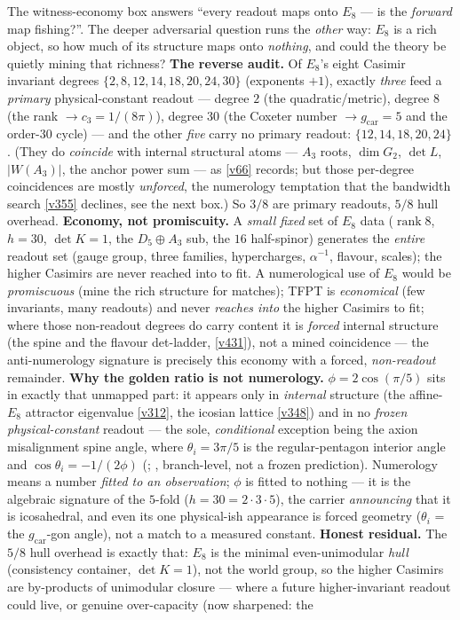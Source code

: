 \documentclass[11pt,a4paper]{article}
\newcommand{\cthree}{c_3}
\newcommand{\gcar}{g_{\mathrm{car}}}
\begin{document}
\begin{winbox}
The witness-economy box answers ``every readout maps onto $E_8$ --- is the \emph{forward} map fishing?''. The deeper adversarial question runs the \emph{other} way: $E_8$ is a rich object, so how much of its structure maps onto \emph{nothing}, and could the theory be quietly mining that richness? \textbf{The reverse audit.} Of $E_8$'s eight Casimir invariant degrees $\{2,8,12,14,18,20,24,30\}$ (exponents $+1$), exactly \emph{three} feed a \emph{primary} physical-constant readout --- degree $2$ (the quadratic/metric), degree $8$ (the rank $\to\cthree=1/(8\pi)$), degree $30$ (the Coxeter number $\to\gcar=5$ and the order-$30$ cycle) --- and the other \emph{five} carry no primary readout: $\{12,14,18,20,24\}$. (They do \emph{coincide} with internal structural atoms --- $A_3$ roots, $\dim G_2$, $\det L$, $|W(A_3)|$, the anchor power sum --- as \vref{v66} records; but those per-degree coincidences are mostly \emph{unforced}, the numerology temptation that the bandwidth search \vref{v355} declines, see the next box.) So $3/8$ are primary readouts, $5/8$ hull overhead. \textbf{Economy, not promiscuity.} A \emph{small fixed} set of $E_8$ data ($\operatorname{rank}8$, $h{=}30$, $\det K{=}1$, the $D_5{\oplus}A_3$ sub, the $16$ half-spinor) generates the \emph{entire} readout set (gauge group, three families, hypercharges, $\alpha^{-1}$, flavour, scales); the higher Casimirs are never reached into to fit. A numerological use of $E_8$ would be \emph{promiscuous} (mine the rich structure for matches); TFPT is \emph{economical} (few invariants, many readouts) and never \emph{reaches into} the higher Casimirs to fit; where those non-readout degrees do carry content it is \emph{forced} internal structure (the spine and the flavour det-ladder, \vref{v431}), not a mined coincidence --- the anti-numerology signature is precisely this economy with a forced, \emph{non-readout} remainder. \textbf{Why the golden ratio is not numerology.} $\phi=2\cos(\pi/5)$ sits in exactly that unmapped part: it appears only in \emph{internal} structure (the affine-$E_8$ attractor eigenvalue \vref{v312}, the icosian lattice \vref{v348}) and in no \emph{frozen physical-constant} readout --- the sole, \emph{conditional} exception being the axion misalignment spine angle, where $\theta_i=3\pi/5$ is the regular-pentagon interior angle and $\cos\theta_i=-1/(2\phi)$ (; \mC, branch-level, not a frozen prediction). Numerology means a number \emph{fitted to an observation}; $\phi$ is fitted to nothing --- it is the algebraic signature of the $5$-fold ($h{=}30{=}2\cdot3\cdot5$), the carrier \emph{announcing} that it is icosahedral, and even its one physical-ish appearance is forced geometry ($\theta_i$ = the $\gcar$-gon angle), not a match to a measured constant. \textbf{Honest residual.} The $5/8$ hull overhead is exactly that: $E_8$ is the minimal even-unimodular \emph{hull} (consistency container, $\det K{=}1$), not the world group, so the higher Casimirs are by-products of unimodular closure --- where a future higher-invariant readout could live, or genuine over-capacity (now sharpened: the 
\end{winbox}
\end{document}
